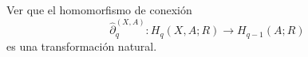 \begin{ejercicio}
Ver que el homomorfismo de conexión
\[
\hat{\partial}_q^{(X, A)} \colon H_q(X, A; R) \longrightarrow H_{q-1}(A; R)
\]
es una transformación natural.
\end{ejercicio}

\begin{demostracion}

\end{demostracion}
